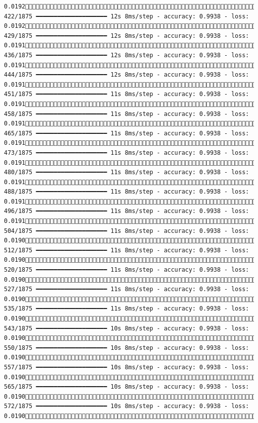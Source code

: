 \documentclass[
  letterpaper,
  DIV=11,
  numbers=noendperiod]{scrreprt}
\begin{document}
\begin{verbatim}
0.0192 422/1875 ━━━━━━━━━━━━━━━━━━━━ 12s 8ms/step - accuracy: 0.9938 - loss: 0.0192 429/1875 ━━━━━━━━━━━━━━━━━━━━ 12s 8ms/step - accuracy: 0.9938 - loss: 0.0191 436/1875 ━━━━━━━━━━━━━━━━━━━━ 12s 8ms/step - accuracy: 0.9938 - loss: 0.0191 444/1875 ━━━━━━━━━━━━━━━━━━━━ 12s 8ms/step - accuracy: 0.9938 - loss: 0.0191 451/1875 ━━━━━━━━━━━━━━━━━━━━ 11s 8ms/step - accuracy: 0.9938 - loss: 0.0191 458/1875 ━━━━━━━━━━━━━━━━━━━━ 11s 8ms/step - accuracy: 0.9938 - loss: 0.0191 465/1875 ━━━━━━━━━━━━━━━━━━━━ 11s 8ms/step - accuracy: 0.9938 - loss: 0.0191 473/1875 ━━━━━━━━━━━━━━━━━━━━ 11s 8ms/step - accuracy: 0.9938 - loss: 0.0191 480/1875 ━━━━━━━━━━━━━━━━━━━━ 11s 8ms/step - accuracy: 0.9938 - loss: 0.0191 488/1875 ━━━━━━━━━━━━━━━━━━━━ 11s 8ms/step - accuracy: 0.9938 - loss: 0.0191 496/1875 ━━━━━━━━━━━━━━━━━━━━ 11s 8ms/step - accuracy: 0.9938 - loss: 0.0191 504/1875 ━━━━━━━━━━━━━━━━━━━━ 11s 8ms/step - accuracy: 0.9938 - loss: 0.0190 512/1875 ━━━━━━━━━━━━━━━━━━━━ 11s 8ms/step - accuracy: 0.9938 - loss: 0.0190 520/1875 ━━━━━━━━━━━━━━━━━━━━ 11s 8ms/step - accuracy: 0.9938 - loss: 0.0190 527/1875 ━━━━━━━━━━━━━━━━━━━━ 11s 8ms/step - accuracy: 0.9938 - loss: 0.0190 535/1875 ━━━━━━━━━━━━━━━━━━━━ 11s 8ms/step - accuracy: 0.9938 - loss: 0.0190 543/1875 ━━━━━━━━━━━━━━━━━━━━ 10s 8ms/step - accuracy: 0.9938 - loss: 0.0190 550/1875 ━━━━━━━━━━━━━━━━━━━━ 10s 8ms/step - accuracy: 0.9938 - loss: 0.0190 557/1875 ━━━━━━━━━━━━━━━━━━━━ 10s 8ms/step - accuracy: 0.9938 - loss: 0.0190 565/1875 ━━━━━━━━━━━━━━━━━━━━ 10s 8ms/step - accuracy: 0.9938 - loss: 0.0190 572/1875 ━━━━━━━━━━━━━━━━━━━━ 10s 8ms/step - accuracy: 0.9938 - loss: 0.0190 
\end{verbatim}
\end{document}
